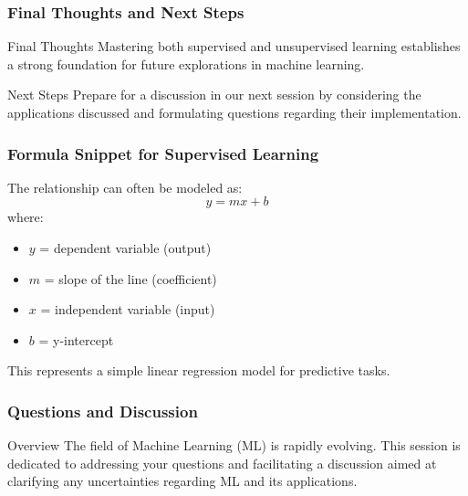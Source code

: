 \documentclass[aspectratio=169]{beamer}
\begin{document}
\begin{frame}[fragile]
    \frametitle{Final Thoughts and Next Steps}
    
    \begin{block}{Final Thoughts}
        Mastering both supervised and unsupervised learning establishes a strong foundation for future explorations in machine learning.
    \end{block}
    
    \begin{block}{Next Steps}
        Prepare for a discussion in our next session by considering the applications discussed and formulating questions regarding their implementation.
    \end{block}
\end{frame}

\begin{frame}[fragile]
    \frametitle{Formula Snippet for Supervised Learning}
    
    The relationship can often be modeled as:
    \begin{equation}
        y = mx + b
    \end{equation}
    where:
    \begin{itemize}
        \item $y$ = dependent variable (output)
        \item $m$ = slope of the line (coefficient)
        \item $x$ = independent variable (input)
        \item $b$ = y-intercept
    \end{itemize}
    
    This represents a simple linear regression model for predictive tasks.
\end{frame}

\begin{frame}[fragile]
    \frametitle{Questions and Discussion}
    \begin{block}{Overview}
        The field of Machine Learning (ML) is rapidly evolving. 
        This session is dedicated to addressing your questions and facilitating a discussion aimed at clarifying any uncertainties regarding ML and its applications.
    \end{block}
\end{frame}
\end{document}
